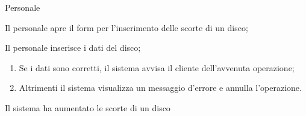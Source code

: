     {Personale}
    {}
    {   \item Il personale apre il form per l'inserimento delle scorte di un disco;
        \item Il personale inserisce i dati del disco;
        \begin{enumerate}[label*=\arabic*.]
            \item Se i dati sono corretti, il sistema avvisa il cliente dell'avvenuta operazione;
            \item Altrimenti il sistema visualizza un messaggio d'errore e annulla l'operazione.
        \end{enumerate}        
    }
    {Il sistema ha aumentato le scorte di un disco}
